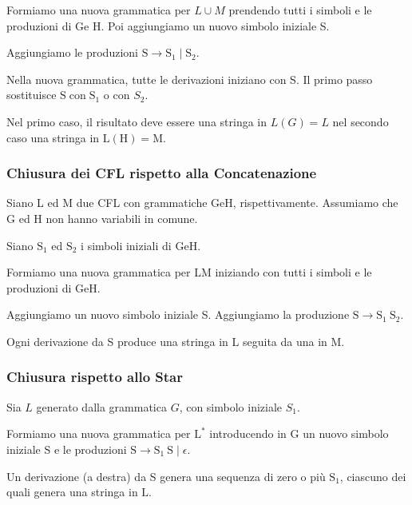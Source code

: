 \vspace{5mm}

Formiamo una nuova grammatica per $L \cup M$ prendendo tutti i simboli e le produzioni di Ge H.
Poi aggiungiamo un nuovo simbolo iniziale S.

Aggiungiamo le produzioni $\mathrm{S} \rightarrow \mathrm{S}_{1} \mid \mathrm{S}_{2}$.

\vspace{5mm}

Nella nuova grammatica, tutte le derivazioni iniziano con S.
Il primo passo sostituisce $\mathrm{S} \operatorname{con} \mathrm{S}_{1}$ o con $S_{2}$.

Nel primo caso, il risultato deve essere una stringa in $L(G)=L$ nel secondo caso una stringa in $\mathrm{L}(\mathrm{H})=\mathrm{M}$.

\subsubsection{Chiusura dei CFL rispetto alla
Concatenazione}

Siano L ed M due CFL con grammatiche $\mathrm{Ge} \mathrm{H}$, rispettivamente. Assumiamo che $\mathrm{G}$ ed $\mathrm{H}$ non hanno variabili in comune.

Siano $\mathrm{S}_{1}$ ed $\mathrm{S}_{2}$ i simboli iniziali di $\mathrm{Ge} \mathrm{H}$.

\vspace{5mm}

Formiamo una nuova grammatica per LM iniziando con tutti i simboli e le produzioni di $\mathrm{Ge} \mathrm{H}$.

Aggiungiamo un nuovo simbolo iniziale S.
Aggiungiamo la produzione $\mathrm{S} \rightarrow \mathrm{S}_{1} \mathrm{~S}_{2}$.

Ogni derivazione da S produce una
stringa in $\mathrm{L}$ seguita da una in $\mathrm{M}$.

\subsubsection{Chiusura rispetto allo Star}
Sia $L$ generato dalla grammatica $G$, con simbolo iniziale $S_{1}$.

Formiamo una nuova grammatica per $\mathrm{L}^{*}$ introducendo in $\mathrm{G}$ un nuovo simbolo iniziale S e le produzioni $\mathrm{S} \rightarrow \mathrm{S}_{1} \mathrm{~S} \mid \epsilon$.

Un derivazione (a destra) da S genera una sequenza di zero o più $\mathrm{S}_{1}$, ciascuno dei quali genera una stringa in $\mathrm{L}$.

